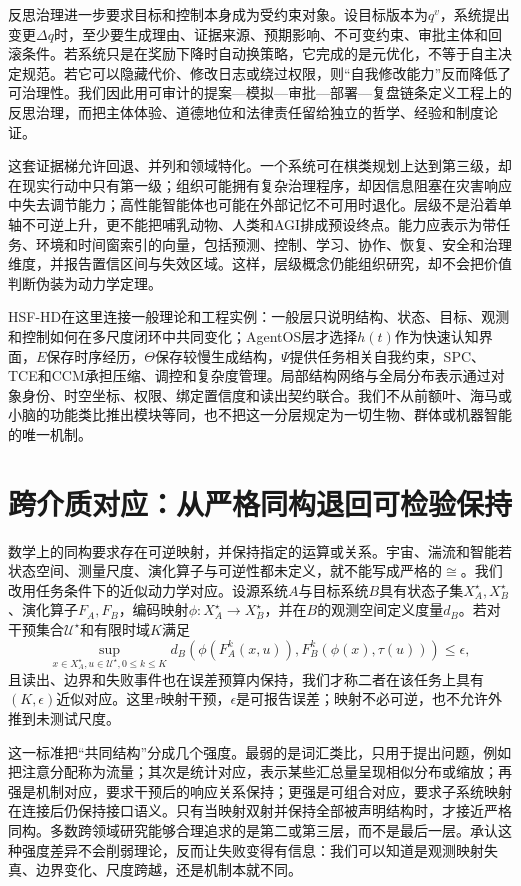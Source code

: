 反思治理进一步要求目标和控制本身成为受约束对象。设目标版本为$q^v$，系统提出变更$\Delta q$时，至少要生成理由、证据来源、预期影响、不可变约束、审批主体和回滚条件。若系统只是在奖励下降时自动换策略，它完成的是元优化，不等于自主决定规范。若它可以隐藏代价、修改日志或绕过权限，则“自我修改能力”反而降低了可治理性。我们因此用可审计的提案—模拟—审批—部署—复盘链条定义工程上的反思治理，而把主体体验、道德地位和法律责任留给独立的哲学、经验和制度论证。

这套证据梯允许回退、并列和领域特化。一个系统可在棋类规划上达到第三级，却在现实行动中只有第一级；组织可能拥有复杂治理程序，却因信息阻塞在灾害响应中失去调节能力；高性能智能体也可能在外部记忆不可用时退化。层级不是沿着单轴不可逆上升，更不能把哺乳动物、人类和AGI排成预设终点。能力应表示为带任务、环境和时间窗索引的向量，包括预测、控制、学习、协作、恢复、安全和治理维度，并报告置信区间与失效区域。这样，层级概念仍能组织研究，却不会把价值判断伪装为动力学定理。

HSF-HD在这里连接一般理论和工程实例：一般层只说明结构、状态、目标、观测和控制如何在多尺度闭环中共同变化；AgentOS层才选择$h(t)$作为快速认知界面，$E$保存时序经历，$\Theta$保存较慢生成结构，$\Psi$提供任务相关自我约束，SPC、TCE和CCM承担压缩、调控和复杂度管理。局部结构网络与全局分布表示通过对象身份、时空坐标、权限、绑定置信度和读出契约联合。我们不从前额叶、海马或小脑的功能类比推出模块等同，也不把这一分层规定为一切生物、群体或机器智能的唯一机制。

\section{跨介质对应：从严格同构退回可检验保持}
\label{sec:media_isomorphism}

数学上的同构要求存在可逆映射，并保持指定的运算或关系。宇宙、湍流和智能若状态空间、测量尺度、演化算子与可逆性都未定义，就不能写成严格的$\cong$。我们改用任务条件下的近似动力学对应。设源系统$A$与目标系统$B$具有状态子集$X_A^\star,X_B^\star$、演化算子$F_A,F_B$，编码映射$\phi:X_A^\star\to X_B^\star$，并在$B$的观测空间定义度量$d_B$。若对干预集合$\mathcal U^\star$和有限时域$K$满足
\[
\sup_{x\in X_A^\star,u\in\mathcal U^\star,0\leq k\leq K}
d_B\!\left(\phi(F_A^k(x,u)),F_B^k(\phi(x),\tau(u))\right)\leq\epsilon,
\]
且读出、边界和失败事件也在误差预算内保持，我们才称二者在该任务上具有$(K,\epsilon)$近似对应。这里$\tau$映射干预，$\epsilon$是可报告误差；映射不必可逆，也不允许外推到未测试尺度。

这一标准把“共同结构”分成几个强度。最弱的是词汇类比，只用于提出问题，例如把注意分配称为流量；其次是统计对应，表示某些汇总量呈现相似分布或缩放；再强是机制对应，要求干预后的响应关系保持；更强是可组合对应，要求子系统映射在连接后仍保持接口语义。只有当映射双射并保持全部被声明结构时，才接近严格同构。多数跨领域研究能够合理追求的是第二或第三层，而不是最后一层。承认这种强度差异不会削弱理论，反而让失败变得有信息：我们可以知道是观测映射失真、边界变化、尺度跨越，还是机制本就不同。

